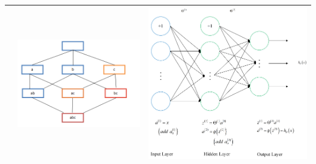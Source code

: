 \begin{longtable}{ccc}
&
\begin{minipage}{0.1\linewidth}
   \includegraphics[width=1.0\linewidth]{./img/ch2/guan.png}
\end{minipage}
&
\begin{minipage}{0.1\linewidth}
   \includegraphics[width=1.0\linewidth]{./img/ch2/ren.png}
\end{minipage}
\tabularnewline
\bottomrule
\end{longtable}


